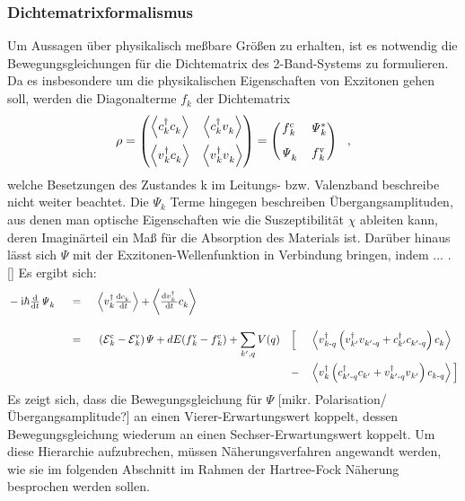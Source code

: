 \documentclass[a4paper,11pt, twoside]{article}
\newcommand{\ind}[2]{{_{#1}^{#2}}}
\newcommand{\+}{\dagger}
\newcommand{\E}{\mathcal{E}}
\newcommand{\dt}[1]{\tfrac{\tt d #1}{\tt d t}}
\newcommand{\bra}{\left \langle}
\newcommand{\ket}{\right \rangle}
\renewcommand{\'}{\tt\textquotesingle}
\renewcommand{\^}{\hat}
\renewcommand{\tt}{\text}
\renewcommand{\~}{\widetilde}
\begin{document}
\subsubsection{Dichtematrixformalismus}
Um Aussagen über physikalisch meßbare Größen zu erhalten, ist es notwendig die Bewegungsgleichungen für die Dichtematrix des 2-Band-Systems zu formulieren. Da es insbesondere um die physikalischen Eigenschaften von Exzitonen gehen soll, werden die Diagonalterme $f\ind{k}{}$  der Dichtematrix
\begin{align*}
\rho 
= \begin{pmatrix}
\bra c\ind{k}{\+}c\ind{k}{} \ket & \bra c\ind{k}{\+}v\ind{k}{} \ket \\[8pt]
\bra v\ind{k}{\+}c\ind{k}{} \ket & \bra v\ind{k}{\+}v\ind{k}{}  \ket
\end{pmatrix}
=\begin{pmatrix}
f\ind{k}{\tt c}& \mathit{\Psi}\ind{k}{*}  \\[8pt]
\mathit{\Psi}\ind{k}{} & f\ind{k}{\tt v}
\end{pmatrix}\ \ ,
\end{align*}
welche Besetzungen des Zustandes k im Leitungs- bzw. Valenzband beschreibe nicht weiter beachtet. Die $\mathit{\Psi}_k$ Terme hingegen beschreiben Übergangsamplituden, aus denen man optische Eigenschaften wie die Suszeptibilität $\chi$ ableiten kann, deren Imaginärteil ein Maß für die Absorption des Materials ist. Darüber hinaus lässt sich $\mathit{\Psi}$ mit der Exzitonen-Wellenfunktion in Verbindung bringen, indem ... . []
Es ergibt sich: 
\begin{alignat*}{5}
& -\tt i\hbar \dt{}\mathit{\Psi}\ind{k}{}  && \ = \ &&  \bra  v\ind{k}{\+}\dt{c\ind{k}{}\,} \ket + \bra \dt{v\ind{k}{\+}\,}c\ind{k}{} \ket &&  &&\\[8pt]
& && \ = \ &&\ (\E \ind{k}{\tt c}-\E \ind{k}{\tt v})\mathit{\Psi}+dE(f\ind{k}{\tt v}-f\ind{k}{\tt c}) 
+ \sum_{k',q}^{} V(q)  &&\Big [ &&\bra  v\ind{k\tt -q}{\+}\left (v\ind{k'}{\+}v\ind{k'\tt -q}{}+c\ind{k'}{\+}c\ind{k'\tt-q}{}\right )c\ind{k}{} 		\ket  \\  
& && && 			   			 &&	-	   &&\bra  v\ind{k}{\+}\left (c\ind{k'\tt -q}{\+}c\ind{k'}{}+v\ind{k'\tt-q}{\+}v\ind{k'}{}\right )c\ind{k\tt -q}{}		\ket  \Big ] 	
\end{alignat*}
Es zeigt sich, dass die Bewegungsgleichung für $\mathit{\Psi}$ [mikr. Polarisation/ Übergangsamplitude?] an einen Vierer-Erwartungswert koppelt, dessen Bewegungsgleichung wiederum an einen Sechser-Erwartungswert koppelt.  Um diese Hierarchie aufzubrechen, müssen Näherungsverfahren angewandt werden, wie sie im folgenden Abschnitt im Rahmen der Hartree-Fock Näherung besprochen werden sollen. 
\end{document}
